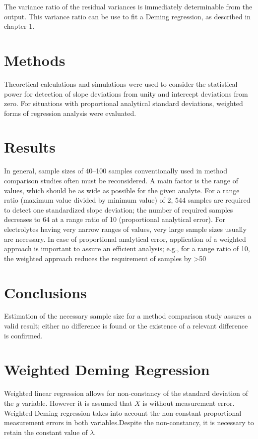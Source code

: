 \documentclass[12pt, a4paper]{report}
\theoremstyle{plain}
\theoremstyle{definition}
\theoremstyle{remark}
\begin{document}
The variance ratio of the residual variances is immediately
determinable from the output. This variance ratio can be use to
fit a Deming regression, as described in chapter 1.






\section{Methods} 
Theoretical calculations and simulations were used to consider the statistical power for detection of slope deviations from 
unity and intercept deviations from zero. For situations with proportional analytical standard deviations, weighted forms of regression analysis were evaluated.

\section{Results} In general, sample sizes of 40–100 samples conventionally used in method comparison studies often must 
be reconsidered. A main factor is the range of values, which should be as wide as possible for the given analyte. 
For a range ratio (maximum value divided by minimum value) of 2, 544 samples are required to detect one standardized slope 
deviation; the number of required samples decreases to 64 at a range ratio of 10 (proportional analytical error). For electrolytes having very narrow ranges of values, very large sample sizes usually are necessary. In case of proportional analytical error, application of a weighted approach is important to assure an efficient analysis; e.g., for a range ratio of 10, the weighted approach reduces the requirement of samples by >50%

\section{Conclusions} Estimation of the necessary sample size for a method comparison study assures a valid result; either no difference is found or the existence of a relevant difference is confirmed.






\section{Weighted Deming Regression}
Weighted linear regression allows for non-constancy of the standard deviation of the $y$ variable. However it is assumed that $X$ is without measurement error. Weighted Deming regression takes into account the non-constant proportional measurement errors in both variables.Despite the non-constancy, it is necessary to retain the constant value of $\lambda$.
\end{document}
